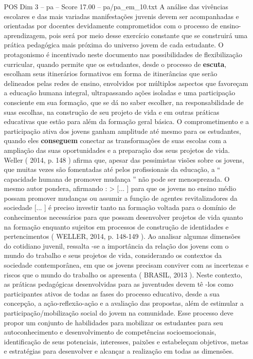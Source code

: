 \begin{textsample}{POS Dim 3 – pa – Score 17.00 – pa/pa\_em\_10.txt}
A análise das vivências escolares e das mais variadas manifestações juvenis devem ser acompanhadas e orientadas por docentes devidamente comprometidos com o processo de ensino-aprendizagem, pois será por meio desse exercício constante que se construirá uma prática pedagógica mais próxima do universo jovem de cada estudante.
O protagonismo é incentivado neste documento nas possibilidades de flexibilização curricular, quando permite que os estudantes, desde o processo de \textbf{escuta}, escolham seus itinerários formativos em forma de itinerâncias que serão delineados pelas redes de ensino, envolvidos por múltiplos aspectos que favoreçam a educação humana integral, ultrapassando ações isoladas e uma participação consciente em sua formação, que se dá no saber escolher, na responsabilidade de suas escolhas, na construção de seu projeto de vida e em outras práticas educativas que estão para além da formação geral básica.
O comprometimento e a participação ativa dos jovens ganham amplitude até mesmo para os estudantes, quando eles \textbf{conseguem} conectar as transformações de suas escolas com a ampliação das suas oportunidades e a preparação dos seus projetos de vida.
Weller ( 2014, p. 148 ) afirma que, apesar das pessimistas visões sobre os jovens, que muitas vezes são fomentadas até pelos profissionais da educação, a “ capacidade humana de promover mudança ” não pode ser menosprezada.
O mesmo autor pondera, afirmando : > [... ] para que os jovens no ensino médio possam promover mudanças ou assumir a função de agentes revitalizadores da sociedade [... ] é preciso investir tanto na formação voltada para o domínio de conhecimentos necessários para que possam desenvolver projetos de vida quanto na formação enquanto sujeitos em processos de construção de identidades e pertencimentos ( WELLER, 2014, p. 148-149 ).
Ao analisar algumas dimensões do cotidiano juvenil, ressalta -se a importância da relação dos jovens com o mundo do trabalho e seus projetos de vida, considerando os contextos da sociedade contemporânea, em que os jovens precisam conviver com as incertezas e riscos que o mundo do trabalho os apresenta ( BRASIL, 2013 ).
Neste contexto, as práticas pedagógicas desenvolvidas para as juventudes devem tê -los como participantes ativos de todas as fases do processo educativo, desde a sua concepção, a ação-reflexão-ação e a avaliação das propostas, além de estimular a participação/mobilização social do jovem na comunidade.
Esse processo deve propor um conjunto de habilidades para mobilizar os estudantes para seu autoconhecimento e desenvolvimento de competências socioemocionais, identificação de seus potenciais, interesses, paixões e estabeleçam objetivos, metas e estratégias para desenvolver e alcançar a realização em todas as dimensões.

\end{textsample}
